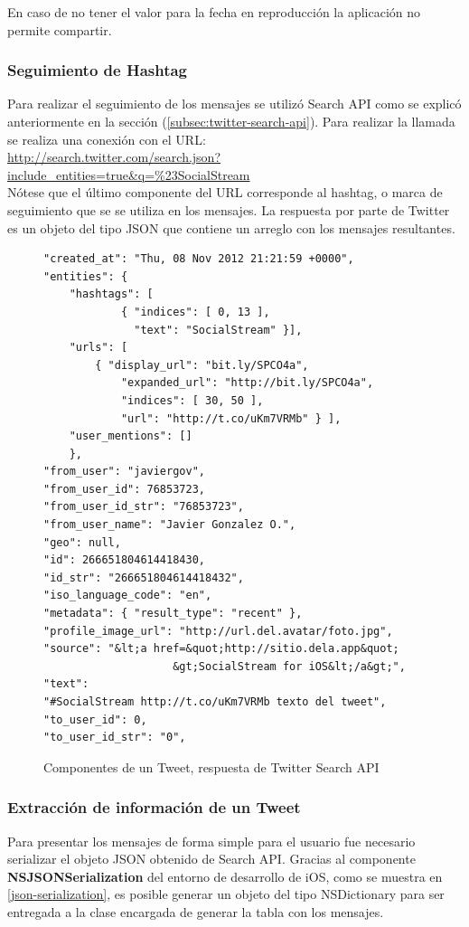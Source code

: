 		
		En caso de no tener el valor para la fecha en reproducción la aplicación no permite compartir.

		\subsubsection{Seguimiento de Hashtag}
		Para realizar el seguimiento de los mensajes se utilizó Search API como se explicó anteriormente  en la sección (\ref{subsec:twitter-search-api}). Para realizar la llamada se realiza una conexión con el URL: \\
		
\url{http://search.twitter.com/search.json?include_entities=true&q=%23SocialStream} \\
		
		Nótese que el último componente del URL corresponde al hashtag, o marca de seguimiento que se se utiliza en los mensajes. La respuesta por parte de Twitter es un objeto del tipo JSON que contiene un arreglo con los mensajes resultantes.

\begin{figure}[H]
	\centering
	\begin{lstlisting}
"created_at": "Thu, 08 Nov 2012 21:21:59 +0000",
"entities": {
    "hashtags": [
    		{ "indices": [ 0, 13 ], 
    		  "text": "SocialStream" }],
    "urls": [
        { "display_url": "bit.ly/SPCO4a",
            "expanded_url": "http://bit.ly/SPCO4a",
            "indices": [ 30, 50 ],
            "url": "http://t.co/uKm7VRMb" } ],
    "user_mentions": [] 
    },
"from_user": "javiergov",
"from_user_id": 76853723,
"from_user_id_str": "76853723",
"from_user_name": "Javier Gonzalez O.",
"geo": null,
"id": 266651804614418430,
"id_str": "266651804614418432",
"iso_language_code": "en",
"metadata": { "result_type": "recent" },
"profile_image_url": "http://url.del.avatar/foto.jpg",
"source": "&lt;a href=&quot;http://sitio.dela.app&quot;
					&gt;SocialStream for iOS&lt;/a&gt;",
"text": 
"#SocialStream http://t.co/uKm7VRMb texto del tweet",
"to_user_id": 0,
"to_user_id_str": "0",
        	\end{lstlisting}
	\caption{Componentes de un Tweet, respuesta de Twitter Search API}
	\label{tweet-json}	
\end{figure}			

		
		\subsubsection{Extracción de información de un Tweet}
Para presentar los mensajes de forma simple para el usuario fue necesario serializar el objeto JSON obtenido de Search API. Gracias al componente \textbf{NSJSONSerialization} del entorno de desarrollo de iOS, como se muestra en \ref{json-serialization}, es posible generar un objeto del tipo NSDictionary para ser entregada a la clase encargada de generar la tabla con los mensajes.


